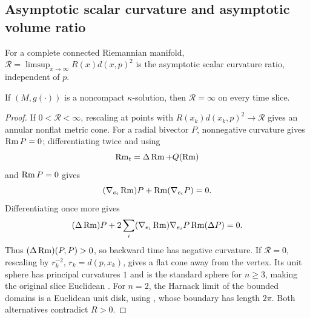 \subsection{Asymptotic scalar curvature and asymptotic volume ratio}
\label{11.4proof}
\begin{definition}
\label{def:kl-asymptotic-scalar-curvature-asymptotic-volume-ratio-asymptotic-scalar-curvature-ratio-definition}

For a complete connected Riemannian manifold,
$\mathcal R=\limsup_{x\to\infty}R(x)d(x,p)^2$ is the asymptotic scalar
curvature ratio, independent of $p$.
\end{definition}
\begin{theorem}
\label{thm:kl-asymptotic-scalar-curvature-asymptotic-volume-ratio-compactness-kappa-solutions}

\label{asympscalar}
If $(M,g(\cdot))$ is a noncompact $\kappa$-solution, then $\mathcal R=\infty$
on every time slice.
\end{theorem}
\begin{proof}
\sketch If $0<\mathcal R<\infty$, rescaling at points with
$R(x_k)d(x_k,p)^2\to\mathcal R$ gives an annular nonflat metric cone.  For
a radial bivector $P$, nonnegative curvature gives $\operatorname{Rm} P=0$; differentiating
twice and using
\begin{equation}\label{curvevol}
\operatorname{Rm}_t=\Delta\operatorname{Rm}+Q(\operatorname{Rm})
\end{equation}
and $\operatorname{Rm} P=0$ gives
\begin{equation}\label{diff1}
(\nabla_{e_i}\operatorname{Rm})P+\operatorname{Rm}(\nabla_{e_i}P)=0.
\end{equation}
Differentiating once more gives
\begin{equation}\label{diff2}
(\Delta\operatorname{Rm})P+2\sum_i(\nabla_{e_i}\operatorname{Rm})\nabla_{e_i}P
\operatorname{Rm}(\Delta P)=0.
\end{equation}
Thus $(\Delta\operatorname{Rm})(P,P)>0$, so backward time has negative curvature.  If
$\mathcal R=0$, rescaling by $r_k^{-2}$, $r_k=d(p,x_k)$, gives a flat cone
away from the vertex.  Its unit sphere has principal curvatures $1$ and is
the standard sphere for $n\geq3$, making the original slice Euclidean
\cite[Theorem A]{Eschenburg}.  For $n=2$, the Harnack limit of the bounded
domains is a Euclidean unit disk, using
\cite[Theorem 10.8]{Burago-Gromov-Perelman},
whose boundary has length $2\pi$.  Both alternatives contradict $R>0$.
\end{proof}

